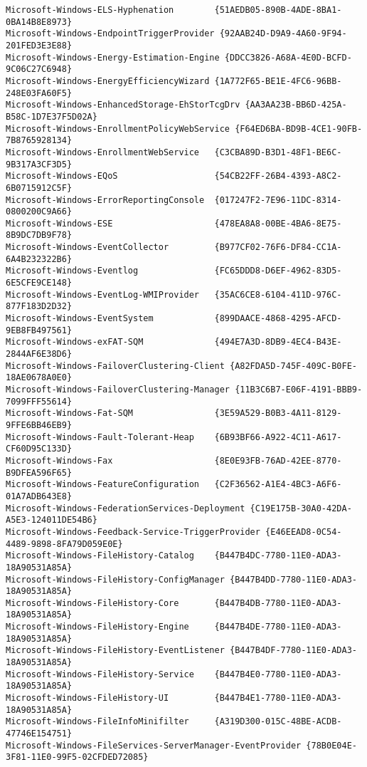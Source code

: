 \documentclass{report}
\begin{document}
\begin{lstlisting}[breaklines=true,basicstyle=\tiny]
Microsoft-Windows-ELS-Hyphenation        {51AEDB05-890B-4ADE-8BA1-0BA14B8E8973}
Microsoft-Windows-EndpointTriggerProvider {92AAB24D-D9A9-4A60-9F94-201FED3E3E88}
Microsoft-Windows-Energy-Estimation-Engine {DDCC3826-A68A-4E0D-BCFD-9C06C27C6948}
Microsoft-Windows-EnergyEfficiencyWizard {1A772F65-BE1E-4FC6-96BB-248E03FA60F5}
Microsoft-Windows-EnhancedStorage-EhStorTcgDrv {AA3AA23B-BB6D-425A-B58C-1D7E37F5D02A}
Microsoft-Windows-EnrollmentPolicyWebService {F64ED6BA-BD9B-4CE1-90FB-7B8765928134}
Microsoft-Windows-EnrollmentWebService   {C3CBA89D-B3D1-48F1-BE6C-9B317A3CF3D5}
Microsoft-Windows-EQoS                   {54CB22FF-26B4-4393-A8C2-6B0715912C5F}
Microsoft-Windows-ErrorReportingConsole  {017247F2-7E96-11DC-8314-0800200C9A66}
Microsoft-Windows-ESE                    {478EA8A8-00BE-4BA6-8E75-8B9DC7DB9F78}
Microsoft-Windows-EventCollector         {B977CF02-76F6-DF84-CC1A-6A4B232322B6}
Microsoft-Windows-Eventlog               {FC65DDD8-D6EF-4962-83D5-6E5CFE9CE148}
Microsoft-Windows-EventLog-WMIProvider   {35AC6CE8-6104-411D-976C-877F183D2D32}
Microsoft-Windows-EventSystem            {899DAACE-4868-4295-AFCD-9EB8FB497561}
Microsoft-Windows-exFAT-SQM              {494E7A3D-8DB9-4EC4-B43E-2844AF6E38D6}
Microsoft-Windows-FailoverClustering-Client {A82FDA5D-745F-409C-B0FE-18AE0678A0E0}
Microsoft-Windows-FailoverClustering-Manager {11B3C6B7-E06F-4191-BBB9-7099FFF55614}
Microsoft-Windows-Fat-SQM                {3E59A529-B0B3-4A11-8129-9FFE6BB46EB9}
Microsoft-Windows-Fault-Tolerant-Heap    {6B93BF66-A922-4C11-A617-CF60D95C133D}
Microsoft-Windows-Fax                    {8E0E93FB-76AD-42EE-8770-B9DFEA596F65}
Microsoft-Windows-FeatureConfiguration   {C2F36562-A1E4-4BC3-A6F6-01A7ADB643E8}
Microsoft-Windows-FederationServices-Deployment {C19E175B-30A0-42DA-A5E3-124011DE54B6}
Microsoft-Windows-Feedback-Service-TriggerProvider {E46EEAD8-0C54-4489-9898-8FA79D059E0E}
Microsoft-Windows-FileHistory-Catalog    {B447B4DC-7780-11E0-ADA3-18A90531A85A}
Microsoft-Windows-FileHistory-ConfigManager {B447B4DD-7780-11E0-ADA3-18A90531A85A}
Microsoft-Windows-FileHistory-Core       {B447B4DB-7780-11E0-ADA3-18A90531A85A}
Microsoft-Windows-FileHistory-Engine     {B447B4DE-7780-11E0-ADA3-18A90531A85A}
Microsoft-Windows-FileHistory-EventListener {B447B4DF-7780-11E0-ADA3-18A90531A85A}
Microsoft-Windows-FileHistory-Service    {B447B4E0-7780-11E0-ADA3-18A90531A85A}
Microsoft-Windows-FileHistory-UI         {B447B4E1-7780-11E0-ADA3-18A90531A85A}
Microsoft-Windows-FileInfoMinifilter     {A319D300-015C-48BE-ACDB-47746E154751}
Microsoft-Windows-FileServices-ServerManager-EventProvider {78B0E04E-3F81-11E0-99F5-02CFDED72085}

\end{lstlisting}
\end{document}
